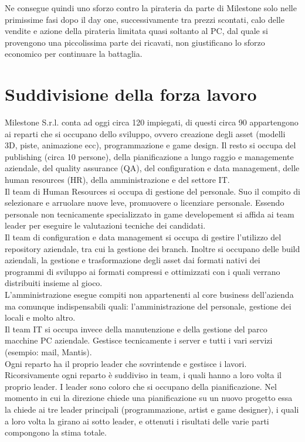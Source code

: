 Ne consegue quindi uno sforzo contro la pirateria da parte di Milestone solo nelle primissime fasi dopo il day one, successivamente tra prezzi scontati, calo delle vendite e azione della pirateria limitata quasi soltanto al PC, dal quale si provengono una piccolissima parte dei ricavati, non giustificano lo sforzo economico per continuare la battaglia.

\section{Suddivisione della forza lavoro}

Milestone S.r.l. conta ad oggi circa 120 impiegati, di questi circa 90 appartengono ai reparti che si occupano dello sviluppo, ovvero creazione degli asset (modelli 3D, piste, animazione ecc), programmazione e game design. Il resto si occupa del publishing (circa 10 persone), della pianificazione a lungo raggio e managemente aziendale, del quality assurance (QA), del configuration e data management, delle human resources (HR), della amministrazione e del settore IT.\\

Il team di Human Resources si occupa di gestione del personale. Suo il compito di selezionare e arruolare nuove leve, promuovere o licenziare personale. Essendo personale non tecnicamente specializzato in game developement si affida ai team leader per eseguire le valutazioni tecniche dei candidati.\\

Il team di configuration e data management si occupa di gestire l'utilizzo del repository aziendale, tra cui la gestione dei branch. Inoltre si occupano delle build aziendali, la gestione e trasformazione degli asset dai formati nativi dei programmi di sviluppo ai formati compressi e ottimizzati con i quali verrano distribuiti insieme al gioco.\\

L'amministrazione esegue compiti non appartenenti al core business dell'azienda ma comunque indispensabili quali: l'amministrazione del personale, gestione dei locali e molto altro.\\

Il team IT si occupa invece della manutenzione e della gestione del parco macchine PC aziendale. Gestisce tecnicamente i server e tutti i vari servizi (esempio: mail, Mantis).\\

Ogni reparto ha il proprio leader che sovrintende e gestisce i lavori. Ricorsivamente ogni reparto è suddiviso in team, i quali hanno a loro volta il proprio leader. I leader sono coloro che si occupano della pianificazione. Nel momento in cui la direzione chiede una pianificazione su un nuovo progetto essa la chiede ai tre leader principali (programmazione, artist e game designer), i quali a loro volta la girano ai sotto leader, e ottenuti i risultati delle varie parti compongono la stima totale.\\

